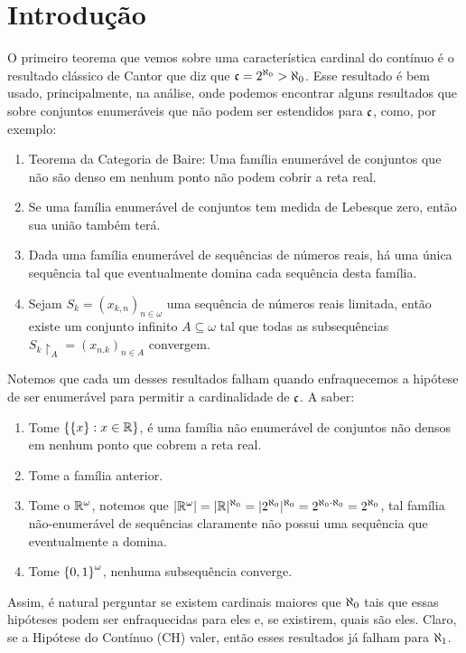 \chapter{Introdução}

O primeiro teorema que vemos sobre uma característica cardinal do contínuo é o resultado clássico de Cantor que diz que $\mathfrak{c} = 2^{\aleph_0} > \aleph_0$. Esse resultado é bem usado, principalmente, na análise, onde podemos encontrar alguns resultados que sobre conjuntos enumeráveis que não podem ser estendidos para $\mathfrak{c}$, como, por exemplo:

\begin{enumerate}[label=\roman*)]
    \item Teorema da Categoria de Baire: Uma família enumerável de conjuntos que não são denso em nenhum ponto não podem cobrir a reta real.
    \item Se uma família enumerável de conjuntos tem medida de Lebesque zero, então sua união também terá. 
    \item Dada uma família enumerável de sequências de números reais, há uma única sequência tal que eventualmente domina cada sequência desta família. 
    \item Sejam $S_k = (x_{k,n})_{n\in \omega}$ uma sequência de números reais limitada, então existe um conjunto infinito $A \subseteq \omega$ tal que todas as subsequências $S_k\upharpoonright_A = (x_{n.k})_{n\in A}$ convergem.
\end{enumerate}

Notemos que cada um desses resultados falham quando enfraquecemos a hipótese de ser enumerável para permitir a cardinalidade de $\mathfrak{c}$. A saber: 

\begin{enumerate}[label=\roman*)]
    \item Tome $\left\{ \left\{ x \right\}:x\in \mathbb{R} \right\}$, é uma família não enumerável de conjuntos não densos em nenhum ponto que cobrem a reta real.
    \item Tome a família anterior. 
    \item Tome o $\mathbb{R}^\omega$, notemos que $|\mathbb{R}^\omega| = |\mathbb{R}|^{\aleph_0} = |2^{\aleph_0}|^{\aleph_0} = 2^{\aleph_0 \cdot \aleph_0} = 2^{\aleph_0}$, tal família não-enumerável de sequências claramente não possui uma sequência que eventualmente a domina. 
    \item Tome $\left\{ 0,1 \right\}^\omega$, nenhuma subsequência converge.
\end{enumerate}

Assim, é natural perguntar se existem cardinais maiores que $\aleph_0$ tais que essas hipóteses podem ser enfraquecidas para eles e, se existirem, quais são eles. Claro, se a Hipótese do Contínuo (CH) valer, então esses resultados já falham para $\aleph_1$. 

